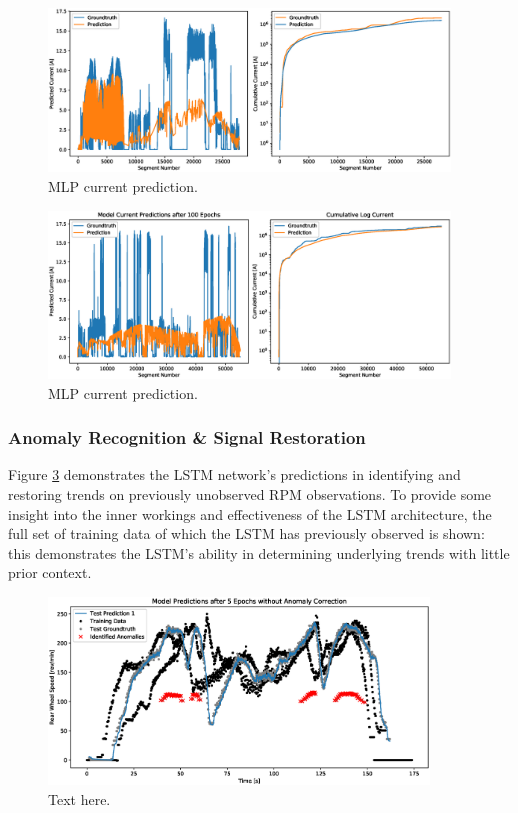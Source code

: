 \documentclass[a4paper, 10pt]{article}
\numberwithin{equation}{section}
\begin{document}
\begin{figure}[h!]
    \centering
    \includegraphics[width=0.95\textwidth]{images/NN_ANN/current_pred_short.eps}
    \caption{MLP current prediction.}
    \label{fig:nn:current_pred_1}
\end{figure}

\begin{figure}[h!]
    \centering
    \includegraphics[width=0.95\textwidth]{images/NN_ANN/current_pred_long.eps}
    \caption{MLP current prediction.}
    \label{fig:nn:current_pred_2}
\end{figure}


\subsubsection{Anomaly Recognition \& Signal Restoration}
Figure \ref{fig:nn:lstm_anom} demonstrates the LSTM network's predictions in identifying and restoring trends on previously unobserved RPM observations. To provide some insight into the inner workings and effectiveness of the LSTM architecture, the full set of training data of which the LSTM has previously observed is shown: this demonstrates the LSTM's ability in determining underlying trends with little prior context.

\begin{figure}[h!]
    \centering
    \includegraphics[width=0.9\textwidth]{images/NN_LSTM/lstm_find_anomalies.eps}
    \caption{Text here.}
    \label{fig:nn:lstm_anom}
\end{figure}
\end{document}
